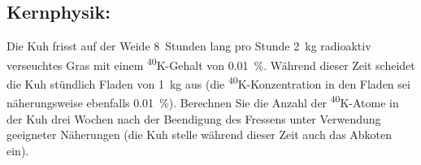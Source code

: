 \vspace{-0.2cm}
\subsection*{Kernphysik:}
\vspace{-0.1cm}
Die Kuh frisst auf der Weide 8~Stunden lang pro Stunde \SI{2}{\kg} radioaktiv verseuchtes Gras mit einem \textsuperscript{40}K-Gehalt von \SI{0,01}{\percent}. Während dieser Zeit scheidet die Kuh stündlich Fladen von \SI{1}{\kg} aus (die \textsuperscript{40}K-Konzentration in den Fladen sei näherungsweise ebenfalls \SI{0,01}{\percent}). Berechnen Sie die Anzahl der \textsuperscript{40}K-Atome in der Kuh drei Wochen nach der Beendigung des Fressens unter Verwendung geeigneter Näherungen (die Kuh stelle während dieser Zeit auch das Abkoten ein).

\vspace{-0.7cm}
